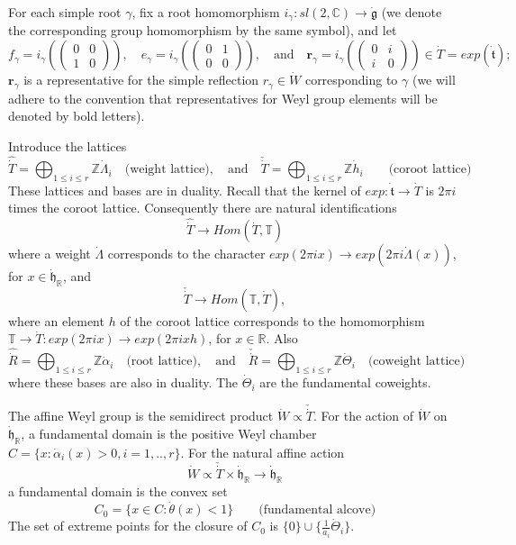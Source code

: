 \documentclass{amsart}
\theoremstyle{conjecture}
\theoremstyle{definition}
\theoremstyle{question}
\theoremstyle{questions}
\theoremstyle{remark}
\theoremstyle{remarks}
\theoremstyle{example}
\numberwithin{equation}{section}
\begin{document}
For each simple
root $\gamma$, fix a root homomorphism $i_{\gamma}:sl(2,\mathbb C)
\to \dot{\mathfrak g}$ (we denote the corresponding group
homomorphism by the same symbol), and let
$$f_{\gamma}=i_{\gamma}(\left (
\begin{matrix} 0&0\\1&0
\end{matrix} \right)),\quad e_{\gamma}=i_{\gamma}(\left (
\begin{matrix} 0&1\\0&0
\end{matrix} \right)), \quad \text{and} \quad \mathbf{r}_{\gamma}=i_{\gamma}(\left (
\begin{matrix} 0&i\\i&0
\end{matrix} \right)) \in \dot T=exp(\dot{\mathfrak t});$$
$\mathbf{r}_{\gamma}$ is a representative for the simple
reflection $r_{\gamma} \in \dot W$ corresponding to $\gamma$ (we
will adhere to the convention that representatives for Weyl group
elements will be denoted by bold letters).

Introduce the lattices
$$\widehat{\dot T}=\bigoplus_{1\le i\le r} \mathbb Z \dot{\Lambda}_i \quad \text{(weight
lattice)}, \quad \text{and} \quad \check{\dot T}=\bigoplus_{1\le
i\le r} \mathbb Z \dot{h}_i \qquad \text{(coroot lattice)}$$
These lattices and bases are in duality. Recall that the kernel of
$exp:\dot{\mathfrak t} \to \dot T$ is $2 \pi i$ times the coroot
lattice. Consequently there are natural identifications
$$\widehat{\dot T} \to Hom(\dot T,\mathbb T)$$ where a weight $\dot{\Lambda}$
corresponds to the character $exp(2\pi ix) \to exp(2\pi
i\dot{\Lambda} (x))$, for $x\in \dot{\mathfrak h}_{\mathbb R}$,
and
$$\check{\dot
T} \to Hom(\mathbb T,\dot T),$$ where an element $h$ of the coroot
lattice corresponds to the homomorphism $\mathbb T\to \dot
T:exp(2\pi ix)\to exp(2\pi ixh)$, for $x\in \mathbb R$. Also
$$\widehat{\dot{R}}=\bigoplus_{1\le i\le r} \mathbb Z \dot{\alpha}_i \quad \text{(root lattice)}, \quad
\text{and} \quad \check{\dot R}=\bigoplus_{1\le i\le r} \mathbb Z
\dot{\Theta}_i \quad \text{(coweight lattice)}$$ where these bases
are also in duality. The $\dot{\Theta}_i$ are the fundamental
coweights.

The affine Weyl group is the semidirect product $\dot W \propto
\check{\dot T}$. For the action of $\dot W$ on $\dot{\mathfrak
h}_{\mathbb R}$, a fundamental domain is the positive Weyl chamber
$C=\{x:\dot{\alpha}_i (x)>0, i=1,..,r\}$. For the natural affine
action
\begin{equation}\label{affineaction}\dot W \propto \check{\dot T}\times \dot{\mathfrak
h}_{\mathbb R} \to \dot{\mathfrak h}_{\mathbb R}\end{equation} a
fundamental domain is the convex set
$$C_0=\{x\in C:\dot{\theta}(x)<1\} \qquad
\text{(fundamental alcove)}$$ The set of extreme points for the
closure of $C_0$ is $\{0\}\cup\{\frac{1}{\dot a_i}\dot{\Theta}_i\}$.
\end{document}
